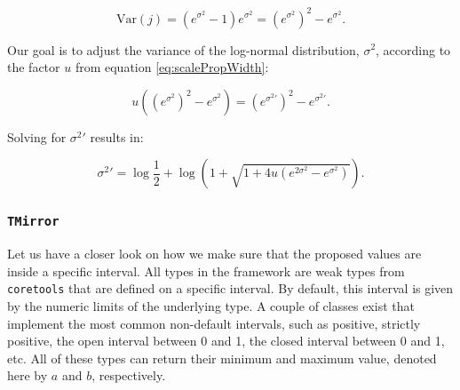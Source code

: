 \documentclass[a4paper,11pt]{article}
\newcommand{\class}[1]{\texttt{#1}}
\begin{document}
\begin{equation*}
 \mbox{Var}(j) = \left(e^{\sigma^2} - 1\right) e^{\sigma^2} = \left( e^{\sigma^2} \right)^2 - e^{\sigma^2}.
\end{equation*}

Our goal is to adjust the variance of the log-normal distribution, $\sigma^2$, according to the factor $u$ from equation \ref{eq:scalePropWidth}:

\begin{equation*}
u \left( \left( e^{\sigma^2} \right)^2 - e^{\sigma^2} \right) = \left( e^{{\sigma^2}'} \right)^2 - e^{{\sigma^2}'}.
\end{equation*}

Solving for ${\sigma^2}'$ results in:

\begin{equation*}
{\sigma^2}' = \log \frac{1}{2} + \log \left(1 + \sqrt{1+4u\left(e^{2\sigma^2} - e^{\sigma^2} \right)} \right).
\end{equation*}

\subsubsection{\class{TMirror}}
Let us have a closer look on how we make sure that the proposed values are inside a specific interval. All types in the framework are weak types from \texttt{coretools} that are defined on a specific interval. By default, this interval is given by the numeric limits of the underlying type. A couple of classes exist that implement the most common non-default intervals, such as positive, strictly positive, the open interval between 0 and 1, the closed interval between 0 and 1, etc. All of these types can return their minimum and maximum value, denoted here by $a$ and $b$, respectively.
\end{document}
